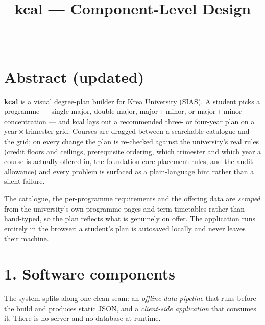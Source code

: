 \documentclass[11pt,a4paper]{article}
\title{\vspace{-1.4cm}\textbf{kcal} — Component-Level Design\\
  \large \coursename}
\author{\groupname\\ \small \groupmembers}
\date{\submissiondate}
\begin{document}
\maketitle
\vspace{-0.6cm}

\section*{Abstract (updated)}

\textbf{kcal} is a visual degree-plan builder for Krea University (SIAS).
A student picks a programme --- single major, double major, major\,+\,minor, or
major\,+\,minor\,+\,concentration --- and kcal lays out a recommended three- or
four-year plan on a year\,$\times$\,trimester grid. Courses are dragged between a
searchable catalogue and the grid; on every change the plan is re-checked against
the university's real rules (credit floors and ceilings, prerequisite ordering,
which trimester and which year a course is actually offered in, the foundation-core
placement rules, and the audit allowance) and every problem is surfaced as a
plain-language hint rather than a silent failure.

The catalogue, the per-programme requirements and the offering data are
\emph{scraped} from the university's own programme pages and term timetables rather
than hand-typed, so the plan reflects what is genuinely on offer. The application
runs entirely in the browser; a student's plan is autosaved locally and never leaves
their machine.

\section*{1. Software components}

The system splits along one clean seam: an \emph{offline data pipeline} that runs
before the build and produces static JSON, and a \emph{client-side application} that
consumes it. There is no server and no database at runtime.
\end{document}
